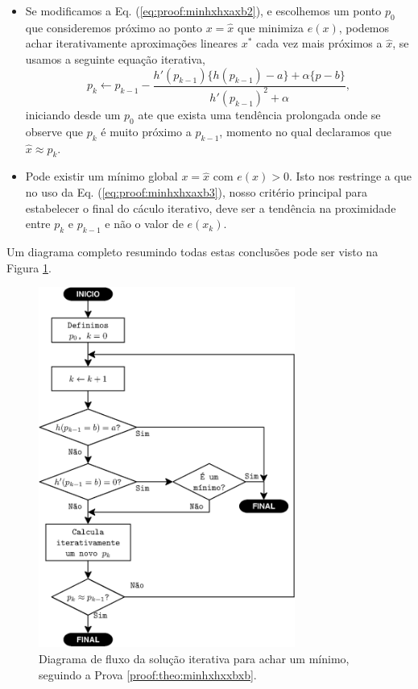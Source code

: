 \begin{myproofT}
\begin{itemize}
\item Se modificamos a Eq. (\ref{eq:proof:minhxhxaxb2}), e escolhemos um ponto  
$p_0$ que consideremos próximo ao ponto $x=\hat{x}$ que minimiza $e(x)$,
podemos achar iterativamente aproximações lineares $x^*$ cada vez mais próximos a  $\hat{x}$,
se usamos a seguinte equação iterativa,
\begin{equation}\label{eq:proof:minhxhxaxb3}
p_{k} \leftarrow p_{k-1} - \frac{ h'(p_{k-1})\{h(p_{k-1})-a\}+\alpha\{p-b\}}{h'(p_{k-1})^2+\alpha},
\end{equation}
iniciando desde um $p_{0}$ 
ate que exista uma tendência prolongada onde se observe que $p_{k}$ é muito próximo a $p_{k-1}$,
momento no qual declaramos que $\hat{x} \approx p_{k}$.
\item Pode existir um mínimo global $x=\hat{x}$ com $e(x)>0$.
Isto nos restringe a que no uso da Eq. (\ref{eq:proof:minhxhxaxb3}),
nosso critério principal para estabelecer o final do cáculo iterativo,
deve ser a tendência na  proximidade entre $p_{k}$ e $p_{k-1}$ 
e não o valor de $e(x_k)$.
\end{itemize}

Um diagrama completo resumindo todas estas conclusões pode ser visto na Figura \ref{fig:fluxohx2}.
\end{myproofT}



\begin{figure}[!h]
     \centering
         \includegraphics[width=0.75\textwidth]{chapters/minimization-hx/fluxo2.eps}
        \caption{Diagrama de fluxo da solução iterativa para achar um mínimo, seguindo a Prova \ref{proof:theo:minhxhxxbxb}.}
        \label{fig:fluxohx2}
\end{figure}


